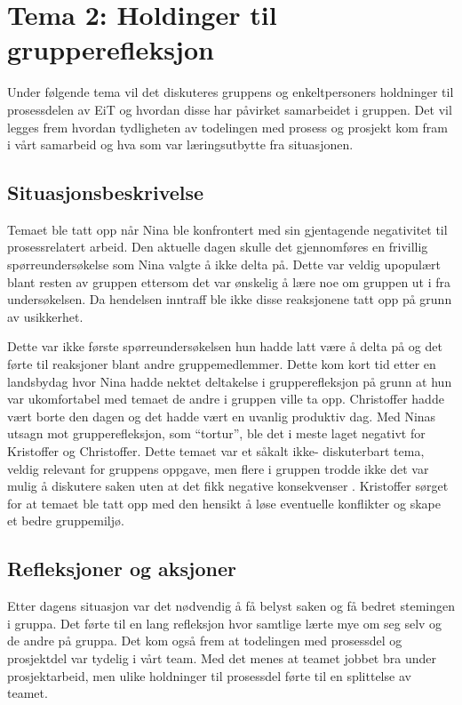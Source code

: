 \chapter{Tema 2: Holdinger til grupperefleksjon}

Under følgende tema vil det diskuteres gruppens og enkeltpersoners holdninger til prosessdelen av EiT og hvordan
disse har påvirket samarbeidet i gruppen. Det vil legges frem hvordan tydligheten av todelingen med prosess og 
prosjekt kom fram i vårt samarbeid og hva som var læringsutbytte fra situasjonen. 

\section{Situasjonsbeskrivelse}

Temaet ble tatt opp når Nina ble konfrontert med sin gjentagende negativitet til prosessrelatert arbeid. Den aktuelle 
dagen skulle det gjennomføres en frivillig spørreundersøkelse som Nina valgte å ikke delta på. Dette var veldig upopulært
blant resten av gruppen ettersom det var ønskelig å lære noe om gruppen ut i fra undersøkelsen. Da hendelsen inntraff 
ble ikke disse reaksjonene tatt opp på grunn av usikkerhet.

Dette var ikke første 
spørreundersøkelsen hun hadde latt være å delta på og det førte til reaksjoner blant andre gruppemedlemmer. 
Dette kom kort tid etter en landsbydag hvor Nina hadde nektet deltakelse i grupperefleksjon på grunn at hun var 
ukomfortabel med temaet de andre i gruppen ville ta opp. Christoffer hadde vært borte den dagen og det hadde 
vært en uvanlig produktiv dag. Med Ninas utsagn mot grupperefleksjon, som ``tortur'', ble det i meste laget
negativt for Kristoffer og Christoffer. Dette temaet var et  såkalt ikke- diskuterbart tema, veldig relevant for gruppens oppgave, men 
flere i gruppen trodde ikke det var mulig å diskutere saken uten at det fikk negative konsekvenser \cite{Artikkel3}. Kristoffer sørget for 
at temaet ble tatt opp med den hensikt å løse eventuelle
konflikter og skape et bedre gruppemiljø.

\section{Refleksjoner og aksjoner}

Etter dagens situasjon var det nødvendig å få belyst saken og få bedret stemingen i gruppa. Det førte til en lang
refleksjon hvor samtlige lærte mye om seg selv og de andre på gruppa. Det kom også frem at todelingen med prosessdel
og prosjektdel var tydelig i vårt team. Med det menes at teamet jobbet bra under prosjektarbeid, men ulike holdninger
til prosessdel førte til en splittelse av teamet. 


